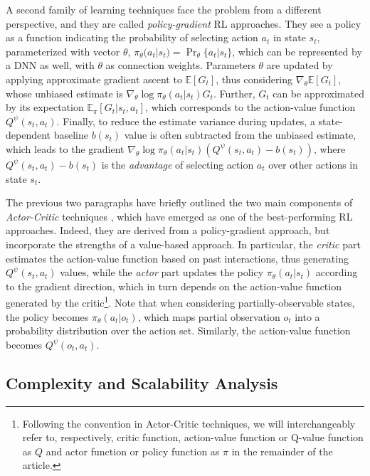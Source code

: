 A second family of learning techniques face the problem from a different perspective, and they are called \textit{policy-gradient} RL approaches. They see a policy as a function indicating the probability of selecting action $a_t$ in state $s_t$, parameterized with vector $\theta$, $\pi_{\theta}(a_t|s_t)=\Pr_{\theta}\{a_t|s_t\}$, which can be represented by a DNN as well, with $\theta$ as connection weights.
Parameters $\theta$ are updated by applying approximate gradient ascent to $\mathbb{E}[G_t]$, thus considering $\nabla_\theta\mathbb{E}[G_t]$, whose unbiased estimate is $\nabla_\theta \log \pi_{\theta}(a_t|s_t)G_t$. Further, $G_t$ can be approximated by its expectation $\mathbb{E}_{\pi}[G_t|s_t, a_t]$, which corresponds to the action-value function $Q^{\psi}(s_t, a_t)$. Finally, to reduce the estimate variance during updates, a state-dependent baseline $b(s_t)$ value is often subtracted from the unbiased estimate, which leads to the gradient $\nabla_\theta \log \pi_{\theta}(a_t|s_t)(Q^{\psi}(s_t, a_t)-b(s_t))$, where $Q^{\psi}(s_t, a_t)-b(s_t)$ is the \textit{advantage} of selecting action $a_t$ over other actions in state $s_t$.

The previous two paragraphs have briefly outlined the two main components of \textit{Actor-Critic} techniques \cite{mnih2016asynchronous}, which have emerged as one of the best-performing RL approaches. Indeed, they are derived from a policy-gradient approach, but incorporate the strengths of a value-based approach. In particular, the \emph{critic} part estimates the action-value function based on past interactions, thus generating $Q^{\psi}(s_t, a_t)$ values, while the \emph{actor} part updates the policy $\pi_{\theta}(a_t|s_t)$ according to the gradient direction, which in turn depends on the action-value function generated by the critic\footnote{Following the convention in Actor-Critic techniques, we will interchangeably refer to, respectively, critic function, action-value function or Q-value function as $Q$ and actor function or policy function as $\pi$ in the remainder of the article.}. Note that when considering partially-observable states, the policy becomes $\pi_{\theta}(a_t|o_t)$, which maps partial observation $o_t$ into a probability distribution over the action set. Similarly, the action-value function becomes $Q^{\psi}(o_t, a_t)$.



\subsection{Complexity and Scalability Analysis}

